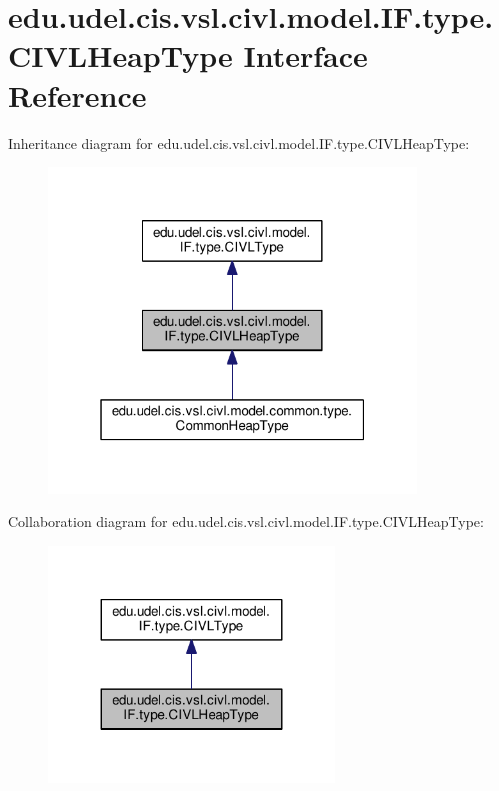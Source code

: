 \hypertarget{interfaceedu_1_1udel_1_1cis_1_1vsl_1_1civl_1_1model_1_1IF_1_1type_1_1CIVLHeapType}{}\section{edu.\+udel.\+cis.\+vsl.\+civl.\+model.\+I\+F.\+type.\+C\+I\+V\+L\+Heap\+Type Interface Reference}
\label{interfaceedu_1_1udel_1_1cis_1_1vsl_1_1civl_1_1model_1_1IF_1_1type_1_1CIVLHeapType}


Inheritance diagram for edu.\+udel.\+cis.\+vsl.\+civl.\+model.\+I\+F.\+type.\+C\+I\+V\+L\+Heap\+Type\+:
\nopagebreak
\begin{figure}[H]
\begin{center}
\leavevmode
\includegraphics[width=277pt]{interfaceedu_1_1udel_1_1cis_1_1vsl_1_1civl_1_1model_1_1IF_1_1type_1_1CIVLHeapType__inherit__graph}
\end{center}
\end{figure}


Collaboration diagram for edu.\+udel.\+cis.\+vsl.\+civl.\+model.\+I\+F.\+type.\+C\+I\+V\+L\+Heap\+Type\+:
\nopagebreak
\begin{figure}[H]
\begin{center}
\leavevmode
\includegraphics[width=215pt]{interfaceedu_1_1udel_1_1cis_1_1vsl_1_1civl_1_1model_1_1IF_1_1type_1_1CIVLHeapType__coll__graph}
\end{center}
\end{figure}

